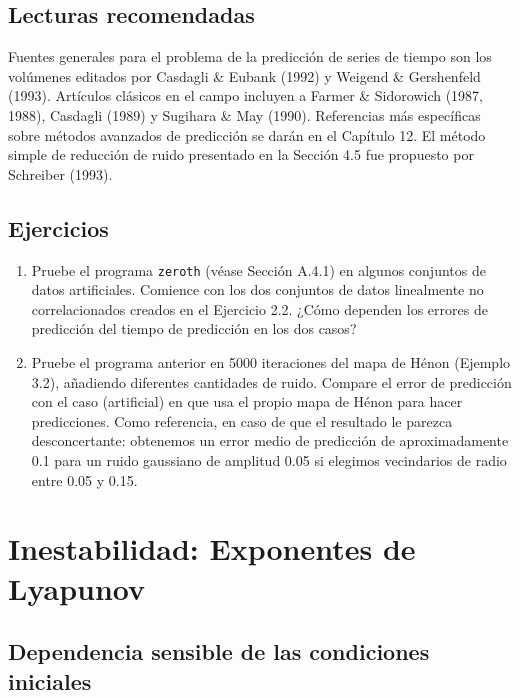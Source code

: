 \documentclass[10pt,a4paper]{book}
\begin{document}
\bigskip

\section*{Lecturas recomendadas}

Fuentes generales para el problema de la predicción de series de tiempo son los volúmenes editados por Casdagli \& Eubank (1992) y Weigend \& Gershenfeld (1993). Artículos clásicos en el campo incluyen a Farmer \& Sidorowich (1987, 1988), Casdagli (1989) y Sugihara \& May (1990). Referencias más específicas sobre métodos avanzados de predicción se darán en el Capítulo 12. El método simple de reducción de ruido presentado en la Sección 4.5 fue propuesto por Schreiber (1993).

\newpage

\section{Ejercicios}

\begin{enumerate}
\item Pruebe el programa \texttt{zeroth} (véase Sección A.4.1) en algunos conjuntos de datos artificiales. Comience con los dos conjuntos de datos linealmente no correlacionados creados en el Ejercicio 2.2. ¿Cómo dependen los errores de predicción del tiempo de predicción en los dos casos?
\newpage
\item Pruebe el programa anterior en 5000 iteraciones del mapa de Hénon (Ejemplo 3.2), añadiendo diferentes cantidades de ruido. Compare el error de predicción con el caso (artificial) en que usa el propio mapa de Hénon para hacer predicciones. Como referencia, en caso de que el resultado le parezca desconcertante: obtenemos un error medio de predicción de aproximadamente 0.1 para un ruido gaussiano de amplitud 0.05 si elegimos vecindarios de radio entre 0.05 y 0.15.
\end{enumerate}



\newpage

\chapter{Inestabilidad: Exponentes de Lyapunov}

\section{Dependencia sensible de las condiciones iniciales}
\end{document}
